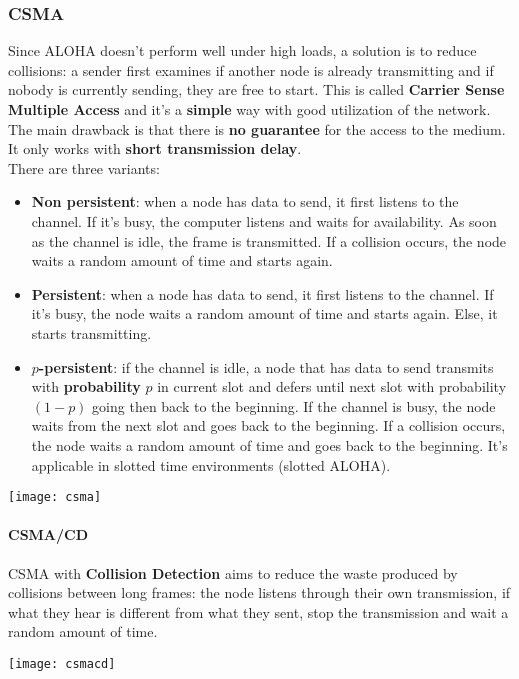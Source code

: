 \subsubsection{CSMA}
Since ALOHA doesn't perform well under high loads, a solution is to reduce collisions: a sender first examines if another node is already transmitting and if nobody is currently sending, they are free to start. This is called \textbf{Carrier Sense Multiple Access} and it's a \textbf{simple} way with good utilization of the network. The main drawback is that there is \textbf{no guarantee} for the access to the medium. It only works with \textbf{short transmission delay}.\\
There are three variants:
\begin{itemize}
	\item \textbf{Non persistent}: when a node has data to send, it first listens to the channel. If it's busy, the computer listens and waits for availability. As soon as the channel is idle, the frame is transmitted. If a collision occurs, the node waits a random amount of time and starts again.
	\item \textbf{Persistent}: when a node has data to send, it first listens to the channel. If it's busy, the node waits a random amount of time and starts again. Else, it starts transmitting.
	\item $p$\textbf{-persistent}: if the channel is idle, a node that has data to send transmits with \textbf{probability} $p$ in current slot and defers until next slot with probability $(1-p)$ going then back to the beginning. If the channel is busy, the node waits from the next slot and goes back to the beginning. If a collision occurs, the node waits a random amount of time and goes back to the beginning. It's applicable in slotted time environments (slotted ALOHA).
\end{itemize}

\begin{center}
	\texttt{[image: csma]}
\end{center}

\paragraph{CSMA/CD}
CSMA with \textbf{Collision Detection} aims to reduce the waste produced by collisions between long frames: the node listens through their own transmission, if what they hear is different from what they sent, stop the transmission and wait a random amount of time.
\begin{center}
	\texttt{[image: csmacd]}
\end{center}


